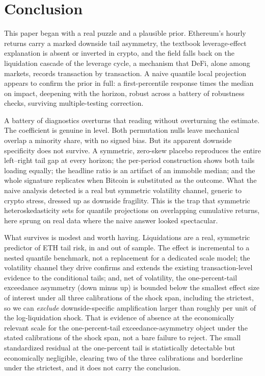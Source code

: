 \section{Conclusion}
\label{sec:conclusion}

This paper began with a real puzzle and a plausible prior. Ethereum's hourly
returns carry a marked downside tail asymmetry, the textbook leverage-effect
explanation is absent or inverted in crypto, and the field falls back on the
liquidation cascade of the leverage cycle, a mechanism that DeFi, alone
among markets, records transaction by transaction. A naive quantile local
projection appears to confirm the prior in full: a first-percentile response
\RatioTailMedImpact{} times the median on impact, deepening with the horizon,
robust across a battery of robustness checks, surviving multiple-testing correction.

A battery of diagnostics overturns that reading without overturning the
estimate. The coefficient is genuine in level. Both permutation nulls
leave mechanical overlap a minority share, with no signed bias. But its
apparent downside specificity does not survive. A symmetric, zero-skew placebo
reproduces the entire left--right tail gap at every horizon; the per-period
construction shows both tails loading equally; the headline ratio is an
artifact of an immobile median; and the whole signature replicates when
Bitcoin is substituted as the outcome. What the naive analysis detected is a
real but symmetric volatility channel, generic to crypto stress, dressed
up as downside fragility. This is the trap that symmetric heteroskedasticity sets
for quantile projections on overlapping cumulative returns, here sprung on
real data where the naive answer looked spectacular.

What survives is modest and worth having. Liquidations are a real,
symmetric predictor of ETH tail risk, in and out of sample. The effect is
incremental to
a nested quantile benchmark, not a replacement for a dedicated scale model;
the volatility
channel they drive confirms and extends the existing transaction-level
evidence to the conditional tails; and, net of volatility, the one-percent-tail
exceedance asymmetry (down minus up) is bounded below the smallest effect
size of interest under all three calibrations of the shock span, including the
strictest, so we can \emph{exclude} downside-specific amplification larger than
roughly \MdeEightyExc{} per unit of the log-liquidation shock. That is evidence of
absence at the economically relevant scale for the one-percent-tail
exceedance-asymmetry object under the stated calibrations of the shock span,
not a bare failure to reject. The small standardized residual at the one-percent tail is statistically
detectable but economically negligible, clearing two of the three calibrations
and borderline under the strictest, and it does not carry the conclusion.

